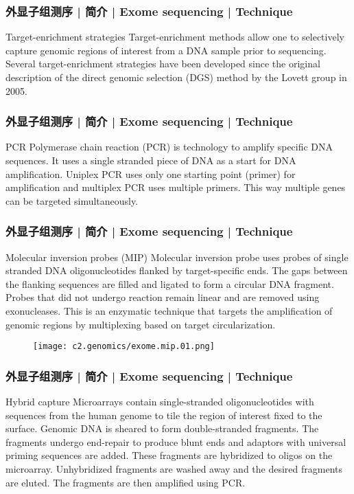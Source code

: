 \begin{frame}
  \frametitle{外显子组测序 | 简介 | Exome sequencing | Technique}
  \begin{block}{Target-enrichment strategies}
    Target-enrichment methods allow one to selectively capture genomic regions of interest from a DNA sample prior to sequencing. Several target-enrichment strategies have been developed since the original description of the direct genomic selection (DGS) method by the Lovett group in 2005.
  \end{block}
\end{frame}

\begin{frame}
  \frametitle{外显子组测序 | 简介 | Exome sequencing | Technique}
  \begin{block}{PCR}
    Polymerase chain reaction (PCR) is technology to amplify specific DNA sequences. It uses a single stranded piece of DNA as a start for DNA amplification. Uniplex PCR uses only one starting point (primer) for amplification and multiplex PCR uses multiple primers. This way multiple genes can be targeted simultaneously.
  \end{block}
\end{frame}

\begin{frame}
  \frametitle{外显子组测序 | 简介 | Exome sequencing | Technique}
  \begin{block}{Molecular inversion probes (MIP)}
    Molecular inversion probe uses probes of single stranded DNA oligonucleotides flanked by target-specific ends. The gaps between the flanking sequences are filled and ligated to form a circular DNA fragment. Probes that did not undergo reaction remain linear and are removed using exonucleases. This is an enzymatic technique that targets the amplification of genomic regions by multiplexing based on target circularization.
  \end{block}
  \begin{figure}
    \centering
    \texttt{[image: c2.genomics/exome.mip.01.png]}
  \end{figure}
\end{frame}

\begin{frame}
  \frametitle{外显子组测序 | 简介 | Exome sequencing | Technique}
  \begin{block}{Hybrid capture}
    Microarrays contain single-stranded oligonucleotides with sequences from the human genome to tile the region of interest fixed to the surface. Genomic DNA is sheared to form double-stranded fragments. The fragments undergo end-repair to produce blunt ends and adaptors with universal priming sequences are added. These fragments are hybridized to oligos on the microarray. Unhybridized fragments are washed away and the desired fragments are eluted. The fragments are then amplified using PCR.
  \end{block}
\end{frame}

